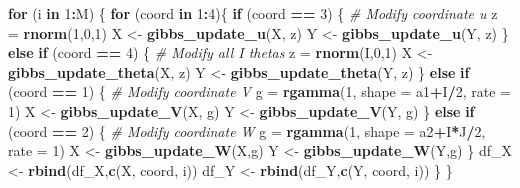 \documentclass[
]{article}
\newenvironment{Shaded}{\begin{snugshade}}{\end{snugshade}}
\newcommand{\AttributeTok}[1]{\textcolor[rgb]{0.13,0.29,0.53}{#1}}
\newcommand{\CommentTok}[1]{\textcolor[rgb]{0.56,0.35,0.01}{\textit{#1}}}
\newcommand{\ControlFlowTok}[1]{\textcolor[rgb]{0.13,0.29,0.53}{\textbf{#1}}}
\newcommand{\DecValTok}[1]{\textcolor[rgb]{0.00,0.00,0.81}{#1}}
\newcommand{\FunctionTok}[1]{\textcolor[rgb]{0.13,0.29,0.53}{\textbf{#1}}}
\newcommand{\NormalTok}[1]{#1}
\newcommand{\OtherTok}[1]{\textcolor[rgb]{0.56,0.35,0.01}{#1}}
\newcommand{\SpecialCharTok}[1]{\textcolor[rgb]{0.81,0.36,0.00}{\textbf{#1}}}
\begin{document}
\begin{Shaded}
\begin{Highlighting}[]
  \ControlFlowTok{for}\NormalTok{ (i }\ControlFlowTok{in} \DecValTok{1}\SpecialCharTok{:}\NormalTok{M) \{}
      \ControlFlowTok{for}\NormalTok{ (coord }\ControlFlowTok{in} \DecValTok{1}\SpecialCharTok{:}\DecValTok{4}\NormalTok{)\{}
        \ControlFlowTok{if}\NormalTok{ (coord }\SpecialCharTok{==} \DecValTok{3}\NormalTok{) \{ }\CommentTok{\# Modify coordinate u}
\NormalTok{          z }\OtherTok{=} \FunctionTok{rnorm}\NormalTok{(}\DecValTok{1}\NormalTok{,}\DecValTok{0}\NormalTok{,}\DecValTok{1}\NormalTok{)}
\NormalTok{          X }\OtherTok{\textless{}{-}} \FunctionTok{gibbs\_update\_u}\NormalTok{(X, z)}
\NormalTok{          Y }\OtherTok{\textless{}{-}} \FunctionTok{gibbs\_update\_u}\NormalTok{(Y, z)}
\NormalTok{        \}}
        \ControlFlowTok{else} \ControlFlowTok{if}\NormalTok{ (coord }\SpecialCharTok{==} \DecValTok{4}\NormalTok{) \{ }\CommentTok{\# Modify all I thetas}
\NormalTok{          z }\OtherTok{=} \FunctionTok{rnorm}\NormalTok{(I,}\DecValTok{0}\NormalTok{,}\DecValTok{1}\NormalTok{)}
\NormalTok{          X }\OtherTok{\textless{}{-}} \FunctionTok{gibbs\_update\_theta}\NormalTok{(X, z)}
\NormalTok{          Y }\OtherTok{\textless{}{-}} \FunctionTok{gibbs\_update\_theta}\NormalTok{(Y, z)}
\NormalTok{        \}}
        \ControlFlowTok{else} \ControlFlowTok{if}\NormalTok{ (coord }\SpecialCharTok{==} \DecValTok{1}\NormalTok{) \{ }\CommentTok{\# Modify coordinate V}
\NormalTok{          g }\OtherTok{=} \FunctionTok{rgamma}\NormalTok{(}\DecValTok{1}\NormalTok{, }\AttributeTok{shape =}\NormalTok{ a1}\SpecialCharTok{+}\NormalTok{I}\SpecialCharTok{/}\DecValTok{2}\NormalTok{, }\AttributeTok{rate =} \DecValTok{1}\NormalTok{)}
\NormalTok{          X }\OtherTok{\textless{}{-}} \FunctionTok{gibbs\_update\_V}\NormalTok{(X, g)}
\NormalTok{          Y }\OtherTok{\textless{}{-}} \FunctionTok{gibbs\_update\_V}\NormalTok{(Y, g)}
\NormalTok{        \}}
        \ControlFlowTok{else} \ControlFlowTok{if}\NormalTok{ (coord }\SpecialCharTok{==} \DecValTok{2}\NormalTok{) \{ }\CommentTok{\# Modify coordinate W}
\NormalTok{          g }\OtherTok{=} \FunctionTok{rgamma}\NormalTok{(}\DecValTok{1}\NormalTok{, }\AttributeTok{shape =}\NormalTok{ a2}\SpecialCharTok{+}\NormalTok{I}\SpecialCharTok{*}\NormalTok{J}\SpecialCharTok{/}\DecValTok{2}\NormalTok{, }\AttributeTok{rate =} \DecValTok{1}\NormalTok{)}
\NormalTok{          X }\OtherTok{\textless{}{-}} \FunctionTok{gibbs\_update\_W}\NormalTok{(X,g)}
\NormalTok{          Y }\OtherTok{\textless{}{-}} \FunctionTok{gibbs\_update\_W}\NormalTok{(Y,g)}
\NormalTok{        \}}
\NormalTok{        df\_X }\OtherTok{\textless{}{-}} \FunctionTok{rbind}\NormalTok{(df\_X,}\FunctionTok{c}\NormalTok{(X, coord, i))}
\NormalTok{        df\_Y }\OtherTok{\textless{}{-}} \FunctionTok{rbind}\NormalTok{(df\_Y,}\FunctionTok{c}\NormalTok{(Y, coord, i))}
\NormalTok{      \}}
\NormalTok{  \}}


\end{Highlighting}
\end{Shaded}
\end{document}
